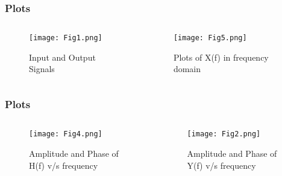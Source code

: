\documentclass{beamer}
\begin{document}
\begin{frame}[fragile]
\frametitle{Plots}
\begin{columns}
\begin{column}{0.5\textwidth}
\begin{figure}[htp]
\begin{flushleft}
    \centering
    \texttt{[image: Fig1.png]}
    \caption{Input and Output Signals}
    \label{fig:plot1}
\end{flushleft}
\end{figure}
\end{column}
\begin{column}{0.5\textwidth}
\begin{figure}[htp]
\begin{flushleft}
    \centering
    \texttt{[image: Fig5.png]}
    \caption{Plots of X(f) in frequency domain}
    \label{fig:plot1}
\end{flushleft}
\end{figure}
\end{column}
\end{columns}
\end{frame}
\begin{frame}[fragile]
\frametitle{Plots}
\begin{columns}
\begin{column}{0.5\textwidth}
\begin{figure}[htp]
\begin{flushleft}
    \centering
    \texttt{[image: Fig4.png]}
    \caption{Amplitude and Phase of H(f) v/s frequency}
    \label{fig:plot1}
\end{flushleft}
\end{figure}
\end{column}
\begin{column}{0.5\textwidth}
\begin{figure}[htp]
\begin{flushleft}
    \centering
    \texttt{[image: Fig2.png]}
    \caption{Amplitude and Phase of Y(f) v/s frequency}
    \label{fig:plot1}
\end{flushleft}
\end{figure}
\end{column}
\end{columns}
\end{frame}
\end{document}

